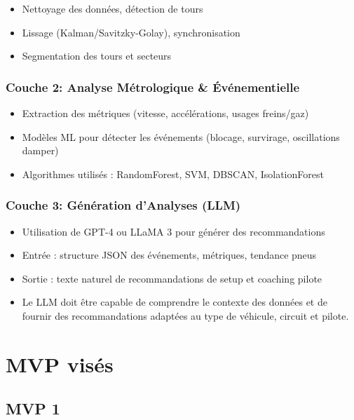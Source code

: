 \documentclass[a4paper,12pt]{report}
\begin{document}
\begin{itemize}
    \item Nettoyage des données, détection de tours
    \item Lissage (Kalman/Savitzky-Golay), synchronisation
    \item Segmentation des tours et secteurs
\end{itemize}

\subsection{Couche 2: Analyse Métrologique \& Événementielle}

\begin{itemize}
    \item Extraction des métriques (vitesse, accélérations, usages freins/gaz)
    \item Modèles ML pour détecter les événements (blocage, survirage, oscillations damper)
    \item Algorithmes utilisés : RandomForest, SVM, DBSCAN, IsolationForest
\end{itemize}

\subsection{Couche 3: Génération d'Analyses (LLM)}

\begin{itemize}
    \item Utilisation de GPT-4 ou LLaMA 3 pour générer des recommandations
    \item Entrée : structure JSON des événements, métriques, tendance pneus
    \item Sortie : texte naturel de recommandations de setup et coaching pilote
    \item Le LLM doit être capable de comprendre le contexte des données et de fournir des recommandations adaptées au type de véhicule, circuit et pilote.
\end{itemize}

\chapter{MVP visés}

\section{MVP 1}
\end{document}
